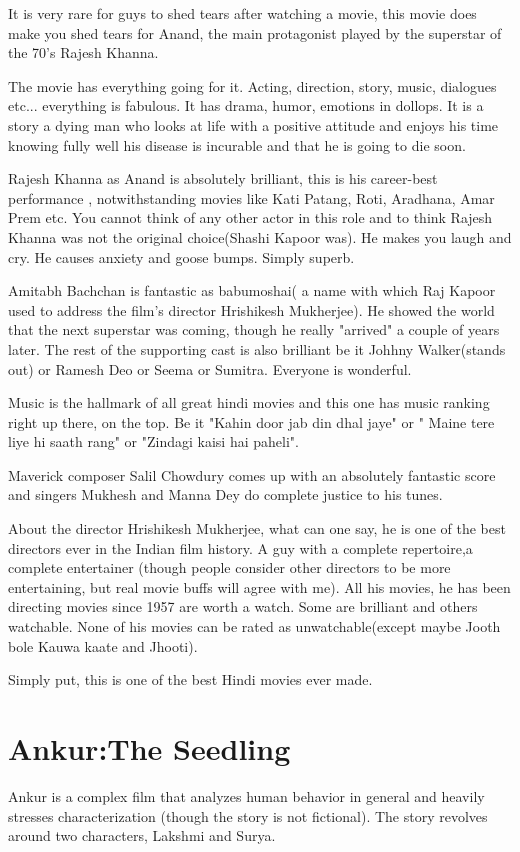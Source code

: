 \documentclass{article}
\begin{document}
It is very rare for guys to shed tears after watching a movie, this movie does make you shed tears for Anand, the main protagonist played by the superstar of the 70's Rajesh Khanna.

The movie has everything going for it. Acting, direction, story, music, dialogues etc... everything is fabulous. It has drama, humor, emotions in dollops. It is a story a dying man who looks at life with a positive attitude and enjoys his time knowing fully well his disease is incurable and that he is going to die soon.

Rajesh Khanna as Anand is absolutely brilliant, this is his career-best performance , notwithstanding movies like Kati Patang, Roti, Aradhana, Amar Prem etc. You cannot think of any other actor in this role and to think Rajesh Khanna was not the original choice(Shashi Kapoor was). He makes you laugh and cry. He causes anxiety and goose bumps. Simply superb.

Amitabh Bachchan is fantastic as babumoshai( a name with which Raj Kapoor used to address the film's director Hrishikesh Mukherjee). He showed the world that the next superstar was coming, though he really "arrived" a couple of years later. The rest of the supporting cast is also brilliant be it Johhny Walker(stands out) or Ramesh Deo or Seema or Sumitra. Everyone is wonderful.

Music is the hallmark of all great hindi movies and this one has music ranking right up there, on the top. Be it "Kahin door jab din dhal jaye" or " Maine tere liye hi saath rang" or "Zindagi kaisi hai paheli".

Maverick composer Salil Chowdury comes up with an absolutely fantastic score and singers Mukhesh and Manna Dey do complete justice to his tunes.

About the director Hrishikesh Mukherjee, what can one say, he is one of the best directors ever in the Indian film history. A guy with a complete repertoire,a complete entertainer (though people consider other directors to be more entertaining, but real movie buffs will agree with me). All his movies, he has been directing movies since 1957 are worth a watch. Some are brilliant and others watchable. None of his movies can be rated as unwatchable(except maybe Jooth bole Kauwa kaate and Jhooti).

Simply put, this is one of the best Hindi movies ever made. 



\section{Ankur:The Seedling}
Ankur is a complex film that analyzes human behavior in general and heavily stresses characterization (though the story is not fictional). The story revolves around two characters, Lakshmi and Surya.
\end{document}
